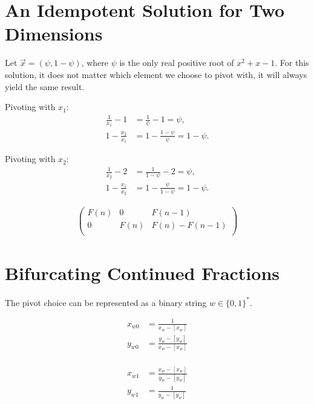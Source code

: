 \documentclass[english,version-2020-11]{uzl-thesis}
\begin{document}
\section{An Idempotent Solution for Two Dimensions}

Let $\vec x = (\psi, 1 - \psi)$, where $\psi$ is the only real positive root of $x^2 + x - 1$.
For this solution, it does not matter which element we choose to pivot with, it will always
yield the same result.

Pivoting with $x_1$:
\begin{align*}
  \frac{1}{x_1} - 1 & = \frac{1}{\psi} - 1 = \psi, \\
  1 - \frac{x_2}{x_1} & = 1 - \frac{1 - \psi}{\psi} = 1 - \psi.
\end{align*}

Pivoting with $x_2$:
\begin{align*}
  \frac{1}{x_2} - 2 & = \frac{1}{1 - \psi} - 2 = \psi, \\
  1 - \frac{x_1}{x_2} & = 1 - \frac{\psi}{1 - \psi} = 1 - \psi.
\end{align*}

\begin{align*}
  \left(
  \begin{array}{cc|c}
    F(n) & 0    & F(n-1) \\
    0    & F(n) & F(n) - F(n-1) \\
  \end{array}
  \right)
\end{align*}

\section{Bifurcating Continued Fractions}

The pivot choice can be represented as a binary string $w \in \{0, 1\}^*$.

\begin{align*}
  x_{w0} & = \frac{1}{x_w - [x_w]}           \\
  y_{w0} & = \frac{y_w - [y_w]}{x_w - [x_w]} \\
\end{align*}

\begin{align*}
  x_{w1} & = \frac{x_w - [x_w]}{y_w - [y_w]} \\
  y_{w1} & = \frac{1}{y_w - [y_w]}           \\
\end{align*}
\end{document}
